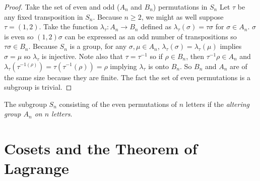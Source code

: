 \begin{proof}
    Take the set of even and odd ($A_n$ and $B_n$) permutations in $S_n$ Let $\tau$ be any fixed transposition in $S_n$. Because $n \geq 2$, we might as well suppose $\tau = (1,2)$. Take the function $\lambda_\tau\colon A_n\to B_n$ defined as $\lambda_\tau(\sigma) =\tau\sigma$ for $\sigma \in A_n$. $\sigma$ is even so $(1,2)\sigma$ can be expressed as an odd number of transpositions so $\tau\sigma \in B_n$. Because $S_n$ is a group, for any $\sigma, \mu \in A_n$, $\lambda_\tau(\sigma)=\lambda_\tau(\mu)$ implies $\sigma = \mu$ so $\lambda_\tau$ is injective. Note also that $\tau = \tau^{-1}$ so if $\rho \in B_n$, then $\tau^{-1}\rho \in A_n$ and $\lambda_\tau(\tau^{-1(\rho)}) = \tau(\tau^{-1}(\rho)) = \rho$ implying $\lambda_\tau$ is onto $B_n$. So $B_n$ and $A_n$ are of the same size because they are finite. The fact the set of even permutations is a subgroup is trivial.
\end{proof}
\begin{definition}
    The subgroup $S_n$ consisting of the even permutations of $n$ letters if the \emph{altering group $A_n$ on $n$ letters}.
\end{definition}

\section{Cosets and the Theorem of Lagrange}


